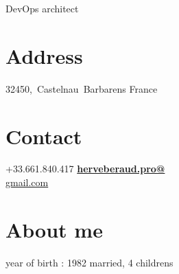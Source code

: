 \documentclass[]{friggeri-cv}
\begin{document}
    {DevOps architect}


\begin{aside}
    \section{Address}
        32450,~Castelnau~Barbarens
        France
        ~
    \section{Contact}
        +33.661.840.417
        \href{mailto:herveberaud.pro@gmail.com}{\textbf{herveberaud.pro@}\\gmail.com}
        ~
    \section{About me}
        year of birth : 1982
        married, 4 childrens 
        ~

\end{aside}
\end{document}
